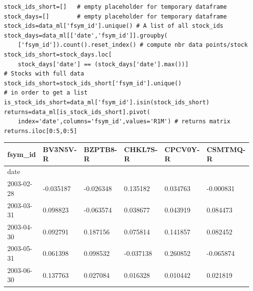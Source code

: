 \begin{verbatim}
stock_ids_short=[]   # empty placeholder for temporary dataframe
stock_days=[]        # empty placeholder for temporary dataframe
stock_ids=data_ml['fsym_id'].unique() # A list of all stock_ids
stock_days=data_ml[['date','fsym_id']].groupby(
    ['fsym_id']).count().reset_index() # compute nbr data points/stock
stock_ids_short=stock_days.loc[
    stock_days['date'] == (stock_days['date'].max())]
# Stocks with full data
stock_ids_short=stock_ids_short['fsym_id'].unique()
# in order to get a list
is_stock_ids_short=data_ml['fsym_id'].isin(stock_ids_short)
returns=data_ml[is_stock_ids_short].pivot(
    index='date',columns='fsym_id',values='R1M') # returns matrix
returns.iloc[0:5,0:5]
\end{verbatim}

\bigskip\noindent
\begin{tabular}{p{}p{}p{}p{}p{}p{}}
\toprule
fsym\_id & BV3N5V-R & BZPTB8-R & CHKL7S-R & CPCV0Y-R & CSMTMQ-R \\
\hline
date &  &  &  &  &  \\
\hline
2003-02-28 & -0.035187 & -0.026348 & 0.135182 & 0.034763 & -0.000831 \\
\hline
2003-03-31 & 0.098823 & -0.063574 & 0.038677 & 0.043919 & 0.084473 \\
\hline
2003-04-30 & 0.092791 & 0.187156 & 0.075814 & 0.141857 & 0.082452 \\
\hline
2003-05-31 & 0.061398 & 0.098532 & -0.037138 & 0.260852 & -0.065874 \\
\hline
2003-06-30 & 0.137763 & 0.027084 & 0.016328 & 0.010442 & 0.021819 \\
\hline
\bottomrule
\end{tabular}

\bigskip